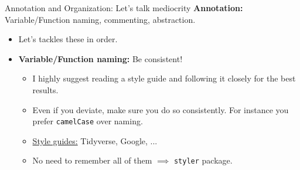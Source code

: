 \documentclass[aspectratio=169,xcolor=dvipsnames]{beamer}\usepackage[]{graphicx}\usepackage[]{color}
\begin{document}

\begin{frame}[t]{Annotation and Organization: Let's talk mediocrity}
  \textbf{Annotation:} \pause Variable/Function naming, commenting, abstraction.\pause
  \begin{itemize}
    \item Let's tackles these in order.\pause
    \item \textbf{Variable/Function naming:} \alert{Be consistent}!\pause
    \begin{itemize}
      \item I highly suggest reading a \alert{style guide} and following it closely for the best results.\pause
      \item Even if you deviate, make sure you do so consistently. For instance you prefer \texttt{camelCase} over  naming.\pause
      \item \underline{Style guides:} Tidyverse, Google, ...\pause
      \item No need to remember all of them $\implies$ \texttt{styler} package.
    \end{itemize}

  \end{itemize}
\end{frame}

\end{document}
